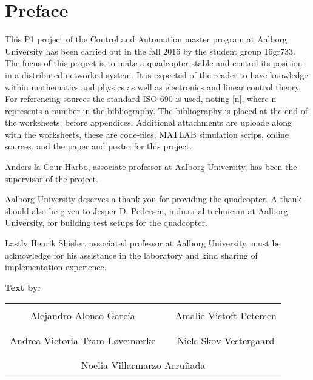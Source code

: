 
\chapter*{Preface}
This P1 project of the Control and Automation master program at Aalborg University has been carried out in the fall 2016 by the student group 16gr733. 
The focus of this project is to make a quadcopter stable and control its position in a distributed networked system. 
It is expected of the reader to have knowledge within mathematics and physics as well as electronics and linear control theory.
For referencing sources the standard ISO 690 is used, noting [n], where n represents a number in the bibliography. The bibliography is placed at the end of the worksheets, before appendices. Additional attachments are uploade along with the worksheets, these are code-files, MATLAB simulation scrips, online sources, and the paper and poster for this project.   

Anders la Cour-Harbo, associate professor at Aalborg University, has been the supervisor of the project. 

Aalborg University deserves a thank you for providing the quadcopter. A thank should also be given to Jesper D. Pedersen, industrial technician at Aalborg University, for building test setups for the quadcopter. 

Lastly Henrik Shiøler, associated professor at Aalborg University, must be acknowledge for his assistance in the laboratory and kind sharing of implementation experience.

\textbf{Text by:}\\
\vspace{-5pt}
\begin{table}[H]
	\centering
		\begin{tabular}{c c c}
			\underline{\phantom{JAERJAERJAERJAERGO}} & \phantom{cookies} & \underline{\phantom{JAERJAERJAERJAERGO}} \\
			Alejandro Alonso García			& \phantom{cookies} & Amalie Vistoft Petersen		\\
			&&\\
			\underline{\phantom{JAERJAERJAERJAERGO}} & \phantom{cookies} & \underline{\phantom{JAERJAERJAERJAERGO}} \\
			Andrea Victoria Tram Løvemærke			& \phantom{cookies} & Niels Skov Vestergaard		\\
			&&\\
	    \multicolumn{3}{c}{\underline{\phantom{JAERJAERJAERJAERGO}}}\\
	    \multicolumn{3}{c}{Noelia Villarmarzo Arruñada}\\				
		\end{tabular}
\end{table}

\pagebreak
\restoregeometry